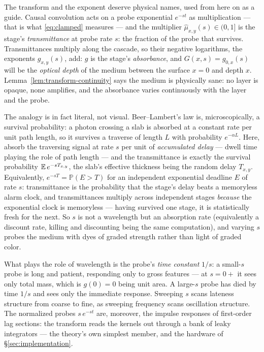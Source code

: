 \begin{remark}\label{rem:optical-depth}
The transform and the exponent deserve physical names, used from here on as a guide.
Causal convolution acts on a probe exponential $e^{-st}$ as multiplication --- that is
what \eqref{eq:clamped} measures --- and the multiplier $\hat\mu_{x,y}(s) \in (0,1]$ is
the stage's \emph{transmittance} at probe rate $s$: the fraction of the probe that
survives. Transmittances multiply along the cascade, so their negative logarithms, the
exponents $g_{x,y}(s)$, add: $g$ is the stage's \emph{absorbance}, and
$G(x,s) = g_{0,x}(s)$ will be the \emph{optical depth} of the medium between the
surface $x = 0$ and depth $x$. Lemma~\ref{lem:transform-continuity} says the medium is
physically sane: no layer is opaque, none amplifies, and the absorbance varies
continuously with the layer and the probe.

The analogy is in fact literal, not visual. Beer--Lambert's law is, microscopically, a
survival probability: a photon crossing a slab is absorbed at a constant rate per unit
path length, so it survives a traverse of length $L$ with probability $e^{-\alpha L}$.
Here, absorb the traversing signal at rate $s$ per unit of \emph{accumulated delay} ---
dwell time playing the role of path length --- and the transmittance is exactly the
survival probability $\mathbb{E}\,e^{-sT_{x,y}}$, the slab's effective thickness being the
random delay $T_{x,y}$. Equivalently, $e^{-sT} = \mathbb{P}(E > T)$ for an independent
exponential deadline $E$ of rate $s$: transmittance is the probability that the stage's
delay beats a memoryless alarm clock, and transmittances multiply across independent
stages \emph{because} the exponential clock is memoryless --- having survived one
stage, it is statistically fresh for the next. So $s$ is not a wavelength but an
absorption rate (equivalently a discount rate, killing and discounting being the same
computation), and varying $s$ probes the medium with dyes of graded strength rather
than light of graded color.

What plays the role of wavelength is the probe's \emph{time constant} $1/s$: a
small-$s$ probe is long and patient, responding only to gross features --- at
$s = 0{+}$ it sees only total mass, which is $g(0) = 0$ being unit area. A
large-$s$ probe has died by time $1/s$ and sees only the immediate response. Sweeping
$s$ scans lateness structure from coarse to fine, as sweeping frequency scans
oscillation structure. The normalized probes $s\,e^{-st}$ are, moreover, the impulse
responses of first-order lag sections: the transform reads the kernels out through a
bank of leaky integrators --- the theory's own simplest member, and the hardware of
\S\ref{sec:implementation}.


\end{remark}
